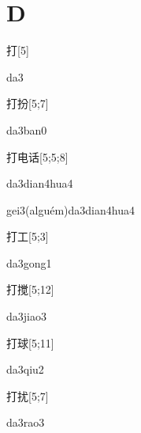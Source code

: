 ﻿%
\section*{D}

\begin{verbete}[da3]{打}[5]
\begin{pronuncia}{da3}
\end{pronuncia}
\end{verbete}

\begin{verbete}[da3ban0]{打扮}[5;7]
\begin{pronuncia}{da3ban0}
\end{pronuncia}
\end{verbete}

\begin{verbete}{打电话}[5;5;8]
\begin{pronuncia}{da3dian4hua4}
\end{pronuncia}
\begin{pronuncia}{gei3(alguém)da3dian4hua4}
\end{pronuncia}
\end{verbete}

\begin{verbete}[da3gong1]{打工}[5;3]
\begin{pronuncia}{da3gong1}
\end{pronuncia}
\end{verbete}

\begin{verbete}[da3jiao3]{打搅}[5;12]
\begin{pronuncia}{da3jiao3}
\end{pronuncia}
\end{verbete}

\begin{verbete}[da3qiu2]{打球}[5;11]
\begin{pronuncia}{da3qiu2}
\end{pronuncia}
\end{verbete}

\begin{verbete}[da3rao3]{打扰}[5;7]
\begin{pronuncia}{da3rao3}
\end{pronuncia}
\end{verbete}

